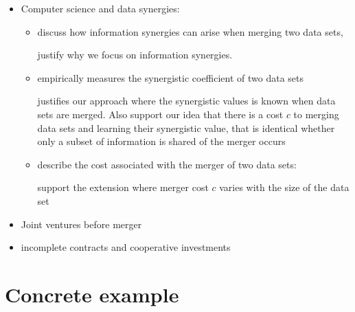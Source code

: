 \documentclass[a4paper,leqno]{article}%
\begin{document}
\begin{itemize}
    \item Computer science and data synergies:
\begin{itemize}
    \item \cite{bertschinger2014quantifying, Griffith2014, olbrich2015information} discuss how information synergies can arise when merging two data sets, 
    
    justify why we focus on information synergies.
    \item \cite{sootla2017analyzing} empirically measures the synergistic coefficient of two data sets
    
    justifies our approach where the synergistic values is known when data sets are merged. Also support our idea that there is a cost $c$ to merging data sets and learning their synergistic value, that is identical whether only a subset of information is shared of the merger occurs
    \item \cite{hernandez1995merge} describe the cost associated with the merger of two data sets: 
    
    support the extension where merger cost $c$ varies with the size of the data set
\end{itemize}
    
    \item Joint ventures before merger
    \item incomplete contracts and cooperative investments \citep{Che1999}
\end{itemize}



\section{Concrete example}
\end{document}
